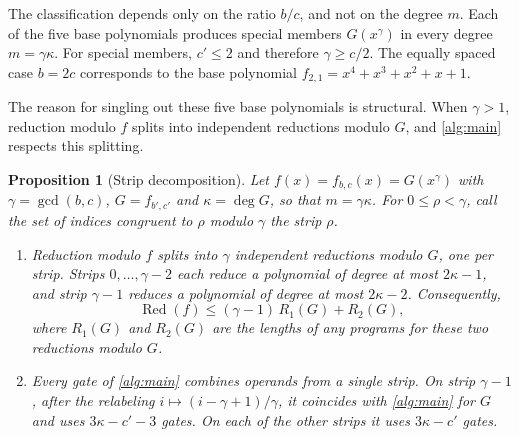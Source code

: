 \documentclass{ieeeaccess}
\theoremstyle{plain}
\newtheorem{proposition}[theorem]{Proposition}
\theoremstyle{definition}
\newcommand{\Red}{\operatorname{Red}}
\begin{document}
The classification depends only on the ratio $b/c$, and not on the degree $m$.
Each of the five base polynomials produces special members $G(x^\gamma)$ in
every degree $m=\gamma\kappa$. For special members, $c'\le2$ and therefore
$\gamma\ge c/2$. The equally spaced case $b=2c$ corresponds to the base
polynomial $f_{2,1}=x^4+x^3+x^2+x+1$.

The reason for singling out these five base polynomials is structural. When
$\gamma>1$, reduction modulo $f$ splits into independent reductions modulo $G$,
and \cref{alg:main} respects this splitting.

\begin{proposition}[Strip decomposition]\label{rem:strips}
Let $f(x)=f_{b,c}(x)=G(x^\gamma)$ with $\gamma=\gcd(b,c)$, $G=f_{b',c'}$ and
$\kappa=\deg G$, so that $m=\gamma\kappa$. For $0\le\rho<\gamma$, call the set of indices
congruent to $\rho$ modulo $\gamma$ the \emph{strip} $\rho$.
\begin{enumerate}[label=(\roman*),itemsep=1pt]
  \item Reduction modulo $f$ splits into $\gamma$ independent reductions modulo
        $G$, one per strip. Strips $0,\dots,\gamma-2$ each reduce a polynomial
        of degree at most $2\kappa-1$, and strip $\gamma-1$ reduces a polynomial of
        degree at most $2\kappa-2$. Consequently,
        \[
          \Red(f)\le(\gamma-1)\,R_1(G)+R_2(G),
        \]
        where $R_1(G)$ and $R_2(G)$ are the lengths of any programs for these
        two reductions modulo $G$.
  \item Every gate of \cref{alg:main} combines operands from a single strip. On
        strip $\gamma-1$, after the relabeling $i\mapsto(i-\gamma+1)/\gamma$,
        it coincides with \cref{alg:main} for $G$ and uses $3\kappa-c'-3$ gates. On
        each of the other strips it uses $3\kappa-c'$ gates.
\end{enumerate}
\end{proposition}
\end{document}

